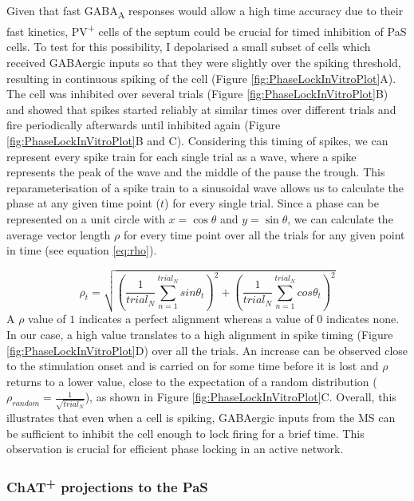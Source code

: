 \documentclass[
  12pt,
  a4paper,
  openany]{book}
\begin{document}
Given that fast GABA\textsubscript{A} responses would allow a high time accuracy due to their fast kinetics, PV\textsuperscript{+} cells of the septum could be crucial for timed inhibition of PaS cells. To test for this possibility, I depolarised a small subset of cells which received GABAergic inputs so that they were slightly over the spiking threshold, resulting in continuous spiking of the cell (Figure \ref{fig:PhaseLockInVitroPlot}A). The cell was inhibited over several trials (Figure \ref{fig:PhaseLockInVitroPlot}B) and showed that spikes started reliably at similar times over different trials and fire periodically afterwards until inhibited again (Figure \ref{fig:PhaseLockInVitroPlot}B and C). Considering this timing of spikes, we can represent every spike train for each single trial as a wave, where a spike represents the peak of the wave and the middle of the pause the trough. This reparameterisation of a spike train to a sinusoidal wave allows us to calculate the phase at any given time point (\(t\)) for every single trial. Since a phase can be represented on a unit circle with \(x=\cos \theta\) and \(y=\sin \theta\), we can calculate the average vector length \(\rho\) for every time point over all the trials for any given point in time (see equation \eqref{eq:rho}).

\begin{equation}
\rho_{t}=\sqrt{\left(\frac{1}{trial_{N}} \sum_{n=1}^{trial_{N}} sin \theta_{t}\right)^2 + \left(\frac{1}{trial_{N}} \sum_{n=1}^{trial_{N}} cos \theta_{t}\right)^2 }
\label{eq:rho}
\end{equation} \noindent A \(\rho\) value of \(1\) indicates a perfect alignment whereas a value of \(0\) indicates none. In our case, a high value translates to a high alignment in spike timing (Figure \ref{fig:PhaseLockInVitroPlot}D) over all the trials. An increase can be observed close to the stimulation onset and is carried on for some time before it is lost and \(\rho\) returns to a lower value, close to the expectation of a random distribution (\(\rho_{random}=\frac{1}{\sqrt{trial_{N}}}\)), as shown in Figure \ref{fig:PhaseLockInVitroPlot}C. Overall, this illustrates that even when a cell is spiking, GABAergic inputs from the MS can be sufficient to inhibit the cell enough to lock firing for a brief time. This observation is crucial for efficient phase locking in an active network.

\FloatBarrier

\hypertarget{chat-projections-to-the-pas}{%
\subsubsection{\texorpdfstring{ChAT\textsuperscript{+} projections to the PaS}{ChAT+ projections to the PaS}}\label{chat-projections-to-the-pas}}
\end{document}
